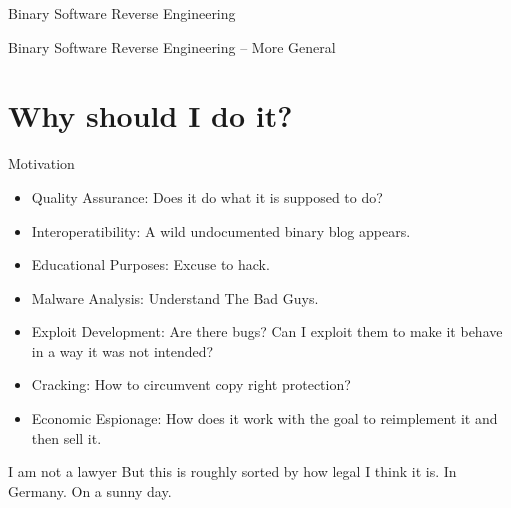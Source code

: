 \documentclass{beamer}
\begin{document}
  \begin{frame}{Binary Software Reverse Engineering}
    \begin{adjustbox}{max totalsize={.9\textwidth}{.7\textheight},center}
    \end{adjustbox}
  \end{frame}

  \begin{frame}{Binary Software Reverse Engineering -- More General}
    \begin{adjustbox}{max totalsize={.9\textwidth}{.7\textheight},center}
    \end{adjustbox}
  \end{frame}

  \section{Why should I do it?}
  \begin{frame}{Motivation}
    \begin{itemize}
      \item Quality Assurance\pause: Does it do what it is supposed to do?\pause
      \item Interoperatibility\pause: A wild undocumented binary blog appears.\pause
      \item Educational Purposes\pause: Excuse to hack.\pause
      \item Malware Analysis\pause: Understand The Bad Guys\texttrademark.\pause
      \item Exploit Development\pause: Are there bugs? Can I exploit them to make it behave in a way it was not intended?\pause
      \item Cracking\pause: How to circumvent copy right protection?\pause
      \item Economic Espionage\pause: How does it work with the goal to reimplement it and then sell it.
    \end{itemize}
    \pause
    \begin{alertblock}{I am not a lawyer}\pause
      But this is roughly sorted by how legal I think it is. \pause In Germany. \pause On a sunny day.
    \end{alertblock}
  \end{frame}
\end{document}
